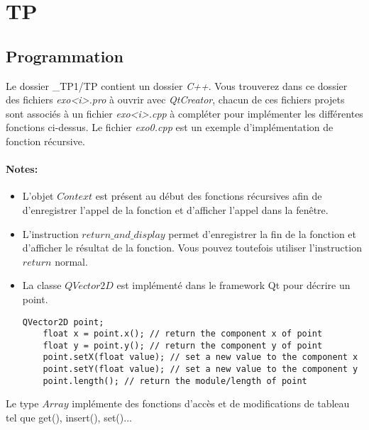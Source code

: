 \documentclass[11pt]{extarticle}
\begin{document}
\section{TP}
\subsection{Programmation}
\noindent Le dossier \_TP1/TP contient un dossier \textit{C++}. Vous trouverez dans ce dossier des fichiers \textit{exo<i>.pro} à ouvrir avec \textit{QtCreator}, chacun de ces fichiers projets sont associés à un fichier \textit{exo<i>.cpp} à compléter pour implémenter les différentes fonctions ci-dessus. Le fichier \textit{exo0.cpp} est un exemple d'implémentation de fonction récursive.
\paragraph{Notes:} 
\begin{itemize}
\item L'objet $Context$ est présent au début des fonctions récursives afin de d'enregistrer l'appel de la fonction et d'afficher l'appel dans la fenêtre. 
\item L'instruction $return\_and\_display$ permet d'enregistrer la fin de la fonction et d'afficher le résultat de la fonction. Vous pouvez toutefois utiliser l'instruction \textbf{$return$} normal.
\item La classe $QVector2D$ est implémenté dans le framework Qt pour décrire un point.
\begin{center}
\begin{lstlisting}[style=customc, escapechar=@]
	QVector2D point;
	float x = point.x(); // return the component x of point
	float y = point.y(); // return the component y of point
	point.setX(float value); // set a new value to the component x
	point.setY(float value); // set a new value to the component y
	point.length(); // return the module/length of point
\end{lstlisting}
\end{center}
\end{itemize}
Le type $Array$ implémente des fonctions d'accès et de modifications de tableau tel que get(), insert(), set()...
\end{document}
